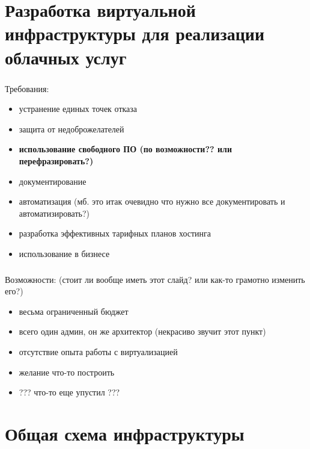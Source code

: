 
\frame[plain]{\titlepage} %


\section{Разработка виртуальной инфраструктуры для реализации облачных услуг}

\begin{frame}
\frametitle{\insertsection}
Требования:
\begin{itemize}
	\item устранение единых точек отказа %
	\item защита от недоброжелателей %
	\item \textbf{использование свободного ПО (по возможности?? или перефразировать?)}
	\item документирование
	\item автоматизация (мб. это итак очевидно что нужно все документировать и автоматизировать?)
	\item разработка эффективных тарифных планов хостинга
	\item использование в бизнесе
\end{itemize}
\end{frame}

\begin{frame}
\frametitle{\insertsection}
Возможности: (стоит ли вообще иметь этот слайд? или как-то грамотно изменить его?)
\begin{itemize}
	\item весьма ограниченный бюджет
	\item всего один админ, он же архитектор (некрасиво звучит этот пункт)
	\item отсутствие опыта работы с виртуализацией
	\item желание что-то построить
	\item ??? что-то еще упустил ???
\end{itemize}
\end{frame}


\section{Общая схема инфраструктуры}

